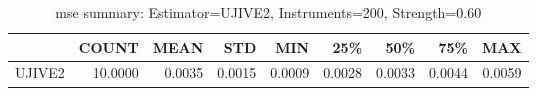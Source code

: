 \begin{table}[ht]
\centering
\caption{mse summary: Estimator=UJIVE2, Instruments=200, Strength=0.60}
\begin{tabular}{lrrrrrrrr}
\toprule
 & COUNT & MEAN & STD & MIN & 25\% & 50\% & 75\% & MAX \\
\midrule
UJIVE2 & 10.0000 & 0.0035 & 0.0015 & 0.0009 & 0.0028 & 0.0033 & 0.0044 & 0.0059 \\
\bottomrule
\end{tabular}
\end{table}

